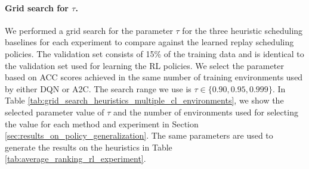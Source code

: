 \vspace{-3mm}
\paragraph{Grid search for $\tau$.}
We performed a grid search for the parameter $\tau$ for the three heuristic scheduling baselines for each experiment to compare against the learned replay scheduling policies. The validation set consists of 15\% of the training data and is identical to the validation set used for learning the RL policies. 
We select the parameter based on ACC scores achieved in the same number of training environments used by either DQN or A2C. The search range we use is $\tau \in \{0.90, 0.95, 0.999\}$. In Table \ref{tab:grid_search_heuristics_multiple_cl_environments}, we show the selected parameter value of $\tau$ and the number of environments used for selecting the value for each method and experiment in Section \ref{sec:results_on_policy_generalization}. The same parameters are used to generate the results on the heuristics in Table \ref{tab:average_ranking_rl_experiment}. 

